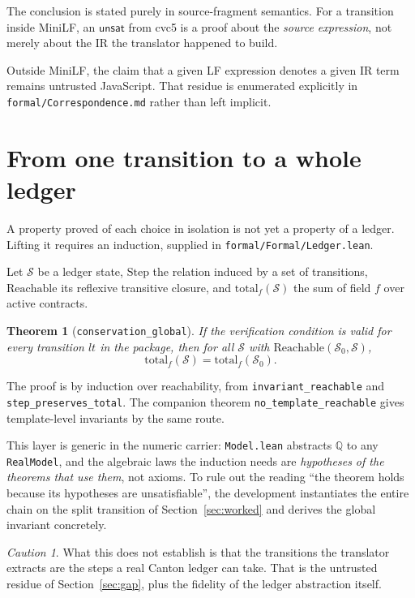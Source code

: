 \documentclass[11pt,a4paper]{article}
\newcommand{\Rat}{\mathbb{Q}}
\newcommand{\unsat}{\mathsf{unsat}}
\newcommand{\code}[1]{\texttt{#1}}
\theoremstyle{definition}
\theoremstyle{plain}
\newtheorem{theorem}[definition]{Theorem}
\theoremstyle{remark}
\newtheorem*{warning}{Caution}
\begin{document}
\noindent
The conclusion is stated purely in source-fragment semantics. For a transition
inside MiniLF, an $\unsat$ from cvc5 is a proof about the \emph{source
expression}, not merely about the IR the translator happened to build.

Outside MiniLF, the claim that a given LF expression denotes a given IR term
remains untrusted JavaScript. That residue is enumerated explicitly in
\code{formal/Correspondence.md} rather than left implicit.

\section{From one transition to a whole ledger}

A property proved of each choice in isolation is not yet a property of a
ledger. Lifting it requires an induction, supplied in
\code{formal/Formal/Ledger.lean}.

Let $\mathcal{S}$ be a ledger state, $\mathrm{Step}$ the relation induced by a
set of transitions, $\mathrm{Reachable}$ its reflexive transitive closure, and
$\mathrm{total}_f(\mathcal{S})$ the sum of field $f$ over active contracts.

\begin{theorem}[\code{conservation\_global}]
If the verification condition is valid for every transition $lt$ in the
package, then for all $\mathcal{S}$ with
$\mathrm{Reachable}(\mathcal{S}_0,\mathcal{S})$,
\[
  \mathrm{total}_f(\mathcal{S}) = \mathrm{total}_f(\mathcal{S}_0).
\]
\end{theorem}

\noindent
The proof is by induction over reachability, from
\code{invariant\_reachable} and \code{step\_preserves\_total}. The companion
theorem \code{no\_template\_reachable} gives template-level invariants by the
same route.

This layer is generic in the numeric carrier: \code{Model.lean} abstracts
$\Rat$ to any \code{RealModel}, and the algebraic laws the induction needs are
\emph{hypotheses of the theorems that use them}, not axioms. To rule out the
reading ``the theorem holds because its hypotheses are unsatisfiable'', the
development instantiates the entire chain on the split transition of
Section~\ref{sec:worked} and derives the global invariant concretely.

\begin{warning}
What this does not establish is that the transitions the translator extracts
are the steps a real Canton ledger can take. That is the untrusted residue of
Section~\ref{sec:gap}, plus the fidelity of the ledger abstraction itself.
\end{warning}
\end{document}
